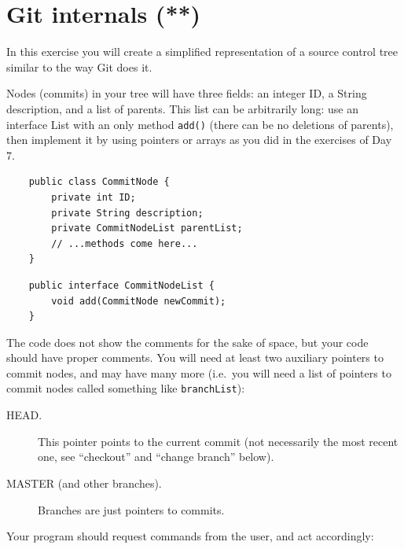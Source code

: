 \documentclass{article}
\begin{document}
\section{Git internals (**)}
\label{sec:git-internals}

In this exercise you will create a simplified representation of a source
control tree similar to the way Git does it. 

Nodes (commits) in your tree will have three fields: an integer ID, a String
description, and a list of parents. This list can be arbitrarily long:
use an interface List with an only method \verb+add()+ (there can be
no deletions of parents), then implement it by using pointers or
arrays as you did in the exercises of Day 7. 

\begin{verbatim}
    public class CommitNode {
        private int ID;
        private String description;
        private CommitNodeList parentList;
        // ...methods come here...
    }
\end{verbatim}

\begin{verbatim}
    public interface CommitNodeList {
        void add(CommitNode newCommit);
    }
\end{verbatim}

The code does not show the comments for the sake of space, but your
code should have proper comments. You will need at least two auxiliary
pointers to commit nodes, and may 
have many more (i.e.~you will need a list of pointers to commit nodes
called something like \verb+branchList+): 

\begin{description}
\item[HEAD. ] This pointer points to the current commit (not
  necessarily the most recent one, see ``checkout'' and ``change
  branch'' below).
\item[MASTER (and other branches).] Branches are just pointers to
  commits. 
\end{description}

Your program should request commands from the user, and act
accordingly: 
\end{document}
